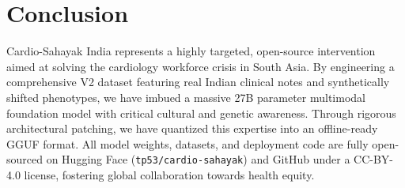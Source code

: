 \documentclass[11pt,a4paper]{article}
\begin{document}
\section{Conclusion}
Cardio-Sahayak India represents a highly targeted, open-source intervention aimed at solving the cardiology workforce crisis in South Asia. By engineering a comprehensive V2 dataset featuring real Indian clinical notes and synthetically shifted phenotypes, we have imbued a massive 27B parameter multimodal foundation model with critical cultural and genetic awareness. Through rigorous architectural patching, we have quantized this expertise into an offline-ready GGUF format. All model weights, datasets, and deployment code are fully open-sourced on Hugging Face (\texttt{tp53/cardio-sahayak}) and GitHub under a CC-BY-4.0 license, fostering global collaboration towards health equity.
\end{document}
